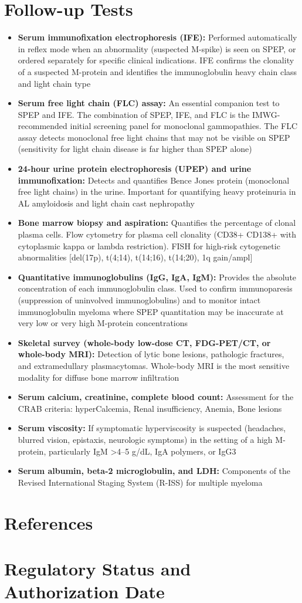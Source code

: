 \section*{Follow-up Tests}
\begin{itemize}
  \item \textbf{Serum immunofixation electrophoresis (IFE):} Performed automatically in reflex mode when an abnormality (suspected M-spike) is seen on SPEP, or ordered separately for specific clinical indications. IFE confirms the clonality of a suspected M-protein and identifies the immunoglobulin heavy chain class and light chain type
  \item \textbf{Serum free light chain (FLC) assay:} An essential companion test to SPEP and IFE. The combination of SPEP, IFE, and FLC is the IMWG-recommended initial screening panel for monoclonal gammopathies. The FLC assay detects monoclonal free light chains that may not be visible on SPEP (sensitivity for light chain disease is far higher than SPEP alone)
  \item \textbf{24-hour urine protein electrophoresis (UPEP) and urine immunofixation:} Detects and quantifies Bence Jones protein (monoclonal free light chains) in the urine. Important for quantifying heavy proteinuria in AL amyloidosis and light chain cast nephropathy
  \item \textbf{Bone marrow biopsy and aspiration:} Quantifies the percentage of clonal plasma cells. Flow cytometry for plasma cell clonality (CD38+ CD138+ with cytoplasmic kappa or lambda restriction). FISH for high-risk cytogenetic abnormalities [del(17p), t(4;14), t(14;16), t(14;20), 1q gain/ampl]
  \item \textbf{Quantitative immunoglobulins (IgG, IgA, IgM):} Provides the absolute concentration of each immunoglobulin class. Used to confirm immunoparesis (suppression of uninvolved immunoglobulins) and to monitor intact immunoglobulin myeloma where SPEP quantitation may be inaccurate at very low or very high M-protein concentrations
  \item \textbf{Skeletal survey (whole-body low-dose CT, FDG-PET/CT, or whole-body MRI):} Detection of lytic bone lesions, pathologic fractures, and extramedullary plasmacytomas. Whole-body MRI is the most sensitive modality for diffuse bone marrow infiltration
  \item \textbf{Serum calcium, creatinine, complete blood count:} Assessment for the CRAB criteria: hyperCalcemia, Renal insufficiency, Anemia, Bone lesions
  \item \textbf{Serum viscosity:} If symptomatic hyperviscosity is suspected (headaches, blurred vision, epistaxis, neurologic symptoms) in the setting of a high M-protein, particularly IgM >4--5 g/dL, IgA polymers, or IgG3
  \item \textbf{Serum albumin, beta-2 microglobulin, and LDH:} Components of the Revised International Staging System (R-ISS) for multiple myeloma
\end{itemize}

\section*{References}



\clearpage
\section*{Regulatory Status and Authorization Date}

\clearpage
